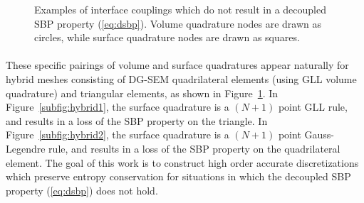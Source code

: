 \documentclass{svjour3}                     %
\begin{document}
\begin{figure}
\centering
\begingroup
\captionsetup[subfigure]{width=.425\textwidth}
\endgroup
\hspace{2em}
\caption{Examples of interface couplings which do not result in a decoupled SBP property (\ref{eq:dsbp}). Volume quadrature nodes are drawn as circles, while surface quadrature nodes are drawn as  squares. }
\label{fig:hybrid}
\end{figure}

\paragraph{}These specific pairings of volume and surface quadratures appear naturally for hybrid meshes consisting of DG-SEM quadrilateral elements (using GLL volume quadrature) and triangular elements, as shown in Figure~\ref{fig:hybrid}.  In Figure~\ref{subfig:hybrid1}, the surface quadrature is a $(N+1)$ point GLL rule, and results in a loss of the SBP property on the triangle.  In Figure~\ref{subfig:hybrid2}, the surface quadrature is a $(N+1)$ point Gauss-Legendre rule, and results in a loss of the SBP property on the quadrilateral element.  The goal of this work is to construct high order accurate discretizations which preserve entropy conservation for situations in which the decoupled SBP property (\ref{eq:dsbp}) does not hold.  
\end{document}
